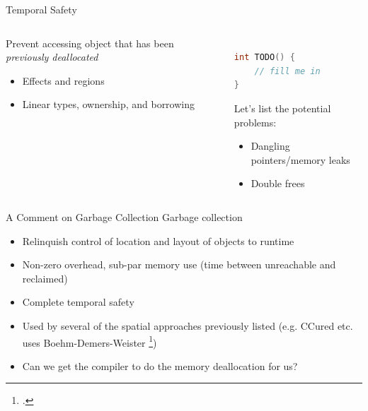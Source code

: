 \documentclass[aspectratio=169]{beamer}
\begin{document}
\begin{frame}[fragile]{Temporal Safety}
  \footnotesize
  \begin{columns}[T]
    \begin{column}{0.45\textwidth}
        Prevent accessing object that has been \emph{previously deallocated}
        \\
        \begin{itemize}
            \item Effects and regions
            \item Linear types, ownership, and borrowing
        \end{itemize}
    \end{column}
    \begin{column}{0.45\textwidth}
\begin{lstlisting}[language=C,mathescape] %,basicstyle={\footnotesize\ttfamily}]

int TODO() {
    // fill me in
}
\end{lstlisting}
Let's list the potential problems:
        \begin{itemize}
            \item Dangling pointers/memory leaks
            \item Double frees
        \end{itemize}
    \end{column}
  \end{columns}
\end{frame}

\begin{frame}{A Comment on Garbage Collection}
Garbage collection
    \begin{itemize}
        \item Relinquish control of location and layout of objects to runtime
        \item Non-zero overhead, sub-par memory use (time between unreachable and reclaimed)
        \item Complete temporal safety
        \item Used by several of the spatial approaches previously listed (e.g. CCured etc. uses Boehm-Demers-Weister \footcite{boehm_garbage_1988})
        \item Can we get the \alert{compiler} to do the memory deallocation for us? %
    \end{itemize}
\end{frame}
\end{document}
